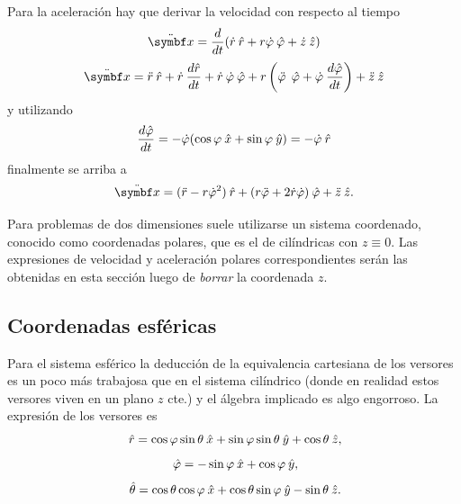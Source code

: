 \documentclass[10pt,oneside]{CBFT_book}
\begin{document}

Para la aceleración hay que derivar la velocidad con respecto al tiempo
\[
	\ddot{\vb{x}} = \dtot{}{t} ( \dot{r} \: \hat{r} + r\dot{\vp} \: \hat{\vp} + \dot{z} \:\hat{z} ) 
\]
\[
	\ddot{\vb{x}} = \ddot{r} \:\hat{r} + \dot{r} \: \dtot{\hat{r}}{t} + \dot{r} \: \dot{\vp} \: \hat{\vp}
	+ r \left( \ddot{\vp} \: \phiver + \dot{\vp} \: \dtot{\hat{\vp}}{t} \right) + \ddot{z} \:\hat{z}
\]
y utilizando 
\[
	\frac{d^{\hspace{-0.05em}} {\hat{\varphi}}}{d {t}^{\hspace{-0.05em}}} = - \dot{ \varphi } ( \cos \varphi \:\hat{x} + \sin  \varphi \:\hat{y} ) = - \dot{\varphi} \: \hat{r}
\]
finalmente se arriba a
\[
	\ddot{\vb{x}} = ( \ddot{r} - r\dot{\vp}^2 ) \rver + ( r\ddot{\vp} + 2 \dot{r} \dot{\vp} ) \phiver + \ddot{z} \:\hat{z}.
\]

Para problemas de dos dimensiones suele utilizarse un sistema coordenado, conocido como coordenadas polares, que es el 
de cilíndricas con $ z \equiv 0 $. Las expresiones de velocidad y aceleración polares correspondientes serán las 
obtenidas en esta sección luego de {\it borrar} la coordenada $z$.

\subsection{Coordenadas esféricas}

Para el sistema esférico la deducción de la equivalencia cartesiana de los versores es un poco más trabajosa que en el 
sistema cilíndrico (donde en realidad estos versores viven en un plano $z$ cte.) y el álgebra implicado es algo 
engorroso. La expresión de los versores es
\[
	\:\hat{r} = \cos\varphi \sin\theta\:\hat{x} + \sin\varphi\sin\theta\:\hat{y} + \cos\theta\:\hat{z},
\]
\[
	\:\hat{\varphi} = -\sin\varphi \:\hat{x} + \cos\varphi \:\hat{y},
\]
\[
	\:\hat{\theta} = \cos\theta \cos\varphi \:\hat{x} + \cos\theta\sin\varphi\:\hat{y} - \sin\theta\:\hat{z}.
\]
\end{document}
